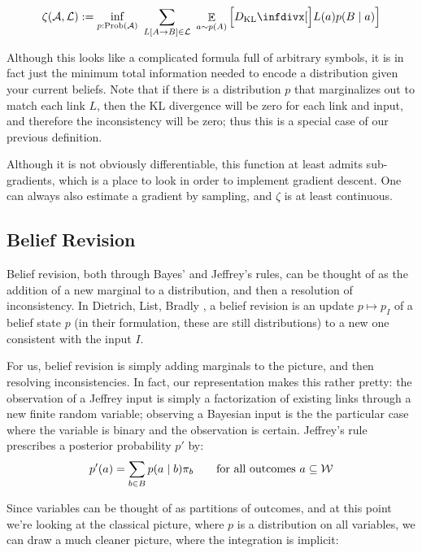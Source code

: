 \documentclass{article}
\begin{document}
	\begin{equation}
	\zeta(\mathcal A, \mathcal L) := \inf_{p : \mathrm{Prob}(\cal A)}~\sum_{L[A \to B]\in \cal L}~\mathop{\mathbb E}_{a \sim p(A)} \left[\kldiv[\Big]{L(a) }{ p(B \mid a) } \right]
	\end{equation}
	
	Although this looks like a complicated formula full of arbitrary symbols, it is in fact just the minimum total information needed to encode a distribution given your current beliefs. Note that if there is a distribution $p$ that marginalizes out to match each link $L$, then the KL divergence will be zero for each link and input, and therefore the inconsistency will be zero; thus this is a special case of our previous definition.
	
	Although it is not obviously differentiable, this function at least admits sub-gradients, which is a place to look in order to implement gradient descent. One can always also estimate a gradient by sampling, and $\zeta$ is at least continuous.
	
	\subsection{Belief Revision}
	
	Belief revision, both through Bayes' and Jeffrey's rules, can be thought of as the addition of a new marginal to a distribution, and then a resolution of inconsistency. In Dietrich, List, Bradly \cite{dietrich2016belief}, a belief revision is an update $p \mapsto p_I$ of a belief state $p$ (in their formulation, these are still distributions) to a new one consistent with the input $I$. 
	
	For us, belief revision is simply adding marginals to the picture, and then resolving inconsistencies. In fact, our representation makes this rather pretty: the observation of a Jeffrey input is simply a factorization of existing links through a new finite random variable; observing a Bayesian input is the the particular case where the variable is binary and the observation is certain.
	Jeffrey's rule prescribes a posterior probability $p'$ by:
	\[ p'(a) = \sum_{b \in B} p(a \mid b) \pi_b \qquad \text{for all outcomes $a \subseteq \cal W$} \]
	
	Since variables can be thought of as partitions of outcomes, and at this point we're looking at the classical picture, where $p$ is a distribution on all variables, we can draw a much cleaner picture, where the integration is implicit:
	
\end{document}
